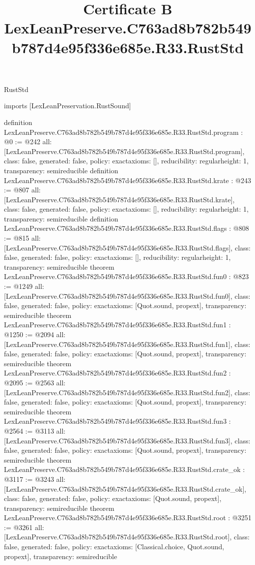 \begin{lexlean}{RustStd}
\title{Certificate B LexLeanPreserve.C763ad8b782b549b787d4e95f336e685e.R33.RustStd}
\begin{coremodule}
imports [LexLeanPreservation.RustSound]

definition LexLeanPreserve.C763ad8b782b549b787d4e95f336e685e.R33.RustStd.program : @0 := @242 {
  all: [LexLeanPreserve.C763ad8b782b549b787d4e95f336e685e.R33.RustStd.program],
  class: false,
  generated: false,
  policy: exact{axioms: []},
  reducibility: regular{height: 1},
  transparency: semireducible
}
definition LexLeanPreserve.C763ad8b782b549b787d4e95f336e685e.R33.RustStd.krate : @243 := @807 {
  all: [LexLeanPreserve.C763ad8b782b549b787d4e95f336e685e.R33.RustStd.krate],
  class: false,
  generated: false,
  policy: exact{axioms: []},
  reducibility: regular{height: 1},
  transparency: semireducible
}
definition LexLeanPreserve.C763ad8b782b549b787d4e95f336e685e.R33.RustStd.flags : @808 := @815 {
  all: [LexLeanPreserve.C763ad8b782b549b787d4e95f336e685e.R33.RustStd.flags],
  class: false,
  generated: false,
  policy: exact{axioms: []},
  reducibility: regular{height: 1},
  transparency: semireducible
}
theorem LexLeanPreserve.C763ad8b782b549b787d4e95f336e685e.R33.RustStd.fun0 : @823 := @1249 {
  all: [LexLeanPreserve.C763ad8b782b549b787d4e95f336e685e.R33.RustStd.fun0],
  class: false,
  generated: false,
  policy: exact{axioms: [Quot.sound, propext]},
  transparency: semireducible
}
theorem LexLeanPreserve.C763ad8b782b549b787d4e95f336e685e.R33.RustStd.fun1 : @1250 := @2094 {
  all: [LexLeanPreserve.C763ad8b782b549b787d4e95f336e685e.R33.RustStd.fun1],
  class: false,
  generated: false,
  policy: exact{axioms: [Quot.sound, propext]},
  transparency: semireducible
}
theorem LexLeanPreserve.C763ad8b782b549b787d4e95f336e685e.R33.RustStd.fun2 : @2095 := @2563 {
  all: [LexLeanPreserve.C763ad8b782b549b787d4e95f336e685e.R33.RustStd.fun2],
  class: false,
  generated: false,
  policy: exact{axioms: [Quot.sound, propext]},
  transparency: semireducible
}
theorem LexLeanPreserve.C763ad8b782b549b787d4e95f336e685e.R33.RustStd.fun3 : @2564 := @3113 {
  all: [LexLeanPreserve.C763ad8b782b549b787d4e95f336e685e.R33.RustStd.fun3],
  class: false,
  generated: false,
  policy: exact{axioms: [Quot.sound, propext]},
  transparency: semireducible
}
theorem LexLeanPreserve.C763ad8b782b549b787d4e95f336e685e.R33.RustStd.crate_ok : @3117 := @3243 {
  all: [LexLeanPreserve.C763ad8b782b549b787d4e95f336e685e.R33.RustStd.crate_ok],
  class: false,
  generated: false,
  policy: exact{axioms: [Quot.sound, propext]},
  transparency: semireducible
}
theorem LexLeanPreserve.C763ad8b782b549b787d4e95f336e685e.R33.RustStd.root : @3251 := @3261 {
  all: [LexLeanPreserve.C763ad8b782b549b787d4e95f336e685e.R33.RustStd.root],
  class: false,
  generated: false,
  policy: exact{axioms: [Classical.choice, Quot.sound, propext]},
  transparency: semireducible
}


\end{coremodule}
\end{lexlean}
